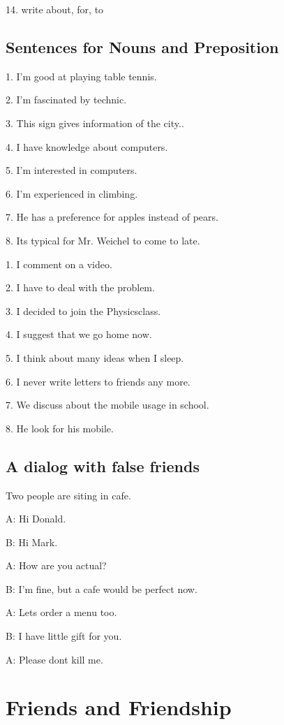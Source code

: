 \documentclass[11pt, oneside]{article}
\begin{document}
14. write about, for, to
\pagebreak

\subsection{Sentences for Nouns and Preposition}

1. I'm good at playing table tennis.

2. I'm fascinated by technic.

3. This sign gives information of the city..

4. I have knowledge about computers.

5. I'm interested in computers.

6. I'm experienced in climbing.

7. He has a preference for apples instead of pears.

8. Its typical for Mr. Weichel to come to late.



1. I comment on a video.

2. I have to deal with the problem.

3. I decided  to join the Physicsclass.

4. I suggest that we go home now.	

5. I think about many ideas when I sleep.

6. I never write letters to friends any more.

7. We discuss about the mobile usage in school.

8. He look for his mobile.

\pagebreak

\subsection{A dialog with false friends}

Two people are siting in cafe.

A: Hi Donald.

B: Hi Mark. 

A: How are you actual?

B: I'm fine, but a cafe would be perfect now.

A: Lets order a menu too.

B: I have little gift for you.

A: Please dont kill me.

\pagebreak

\section{Friends and Friendship}
\end{document}
